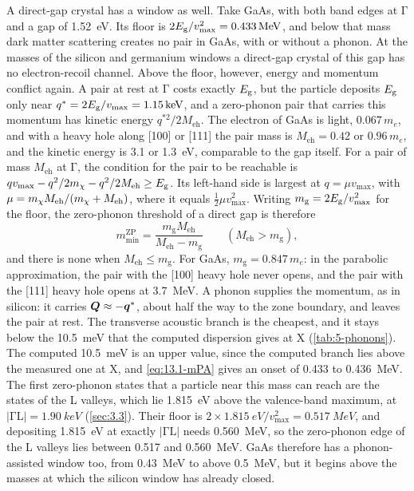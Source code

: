 A direct-gap crystal has a window as well. Take GaAs, with both band edges at $\mathrm{\Gamma}$ and a gap of \SI{1.52}{eV}. Its floor is $2E_{\mathrm{g}}/v_{\mathrm{max}}^2 = \SI{0.433}{MeV}$, and below that mass dark matter scattering creates no pair in GaAs, with or without a phonon. At the masses of the silicon and germanium windows a direct-gap crystal of this gap has no electron-recoil channel. Above the floor, however, energy and momentum conflict again. A pair at rest at $\mathrm{\Gamma}$ costs exactly $E_{\mathrm{g}}$, but the particle deposits $E_{\mathrm{g}}$ only near $q^* = 2E_{\mathrm{g}}/v_{\mathrm{max}} = \SI{1.15}{keV}$, and a zero-phonon pair that carries this momentum has kinetic energy $q^{*2}/2M_{\mathrm{eh}}$. The electron of GaAs is light, $0.067\,m_e$, and with a heavy hole along [100] or [111] the pair mass is $M_{\mathrm{eh}} = 0.42$ or $0.96\,m_e$, and the kinetic energy is 3.1 or \SI{1.3}{eV}, comparable to the gap itself. For a pair of mass $M_{\mathrm{eh}}$ at $\mathrm{\Gamma}$, the condition for the pair to be reachable is $qv_{\mathrm{max}} - q^2/2m_{\chi} - q^2/2M_{\mathrm{eh}} \ge E_{\mathrm{g}}$. Its left-hand side is largest at $q = \mu v_{\mathrm{max}}$, with $\mu = m_{\chi} M_{\mathrm{eh}}/(m_{\chi} + M_{\mathrm{eh}})$, where it equals $\frac12\mu v_{\mathrm{max}}^2$. Writing $m_{\mathrm{g}} = 2E_{\mathrm{g}}/v_{\mathrm{max}}^2$ for the floor, the zero-phonon threshold of a direct gap is therefore
\begin{equation}
  m_{\mathrm{min}}^{\mathrm{ZP}} = \frac{m_{\mathrm{g}}M_{\mathrm{eh}}}{M_{\mathrm{eh}} - m_{\mathrm{g}}} \qquad (M_{\mathrm{eh}} > m_{\mathrm{g}}) ,
  \label{eq:13.1-mZPdir}
\end{equation}
and there is none when $M_{\mathrm{eh}} \le m_{\mathrm{g}}$. For GaAs, $m_{\mathrm{g}} = 0.847\,m_e$: in the parabolic approximation, the pair with the [100] heavy hole never opens, and the pair with the [111] heavy hole opens at \SI{3.7}{MeV}. A phonon supplies the momentum, as in silicon: it carries $\bm{Q} \approx -\bm{q}^*$, about half the way to the zone boundary, and leaves the pair at rest. The transverse acoustic branch is the cheapest, and it stays below the \SI{10.5}{meV} that the computed dispersion gives at X (\cref{tab:5-phonons}). The computed \SI{10.5}{meV} is an upper value, since the computed branch lies above the measured one at X, and \cref{eq:13.1-mPA} gives an onset of 0.433 to \SI{0.436}{MeV}. The first zero-phonon states that a particle near this mass can reach are the states of the L valleys, which lie \SI{1.815}{eV} above the valence-band maximum, at $|\mathrm{\Gamma}\mathrm{L}| = \SI{1.90}{keV}$ (\cref{sec:3.3}). Their floor is $2\times\SI{1.815}{eV}/v_{\mathrm{max}}^2 = \SI{0.517}{MeV}$, and depositing \SI{1.815}{eV} at exactly $|\mathrm{\Gamma}\mathrm{L}|$ needs \SI{0.560}{MeV}, so the zero-phonon edge of the L valleys lies between 0.517 and \SI{0.560}{MeV}. GaAs therefore has a phonon-assisted window too, from \SI{0.43}{MeV} to above \SI{0.5}{MeV}, but it begins above the masses at which the silicon window has already closed.

